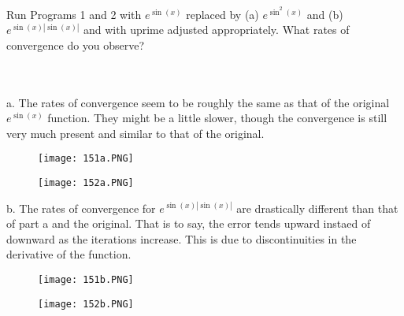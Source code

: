 Run Programs 1 and 2 with $e^{\sin(x)}$ replaced by (a) $e^{\sin^2(x)}$ and (b) $e^{\sin(x)|\sin(x)|}$
and with uprime adjusted appropriately. What rates of convergence do you observe?\\\\

\begin{solution}\renewcommand{\qedsymbol}{}\ \\
    a. The rates of convergence seem to be roughly the same as that of the original $e^{\sin(x)}$
    function. They might be a little slower, though the convergence is still very much present and
    similar to that of the original.\\

    \begin{figure}[htp]
        \centering
        \texttt{[image: 151a.PNG]}
    \end{figure}
    \begin{figure}[htp]
        \centering
        \texttt{[image: 152a.PNG]}
    \end{figure}



b. The rates of convergence for $e^{\sin(x)|\sin(x)|}$ are drastically different than that of part a and
the original. That is to say, the error tends upward instaed of downward as the iterations increase.
This is due to discontinuities in the derivative of the function.

    \begin{figure}[htp]
        \centering
        \texttt{[image: 151b.PNG]}
    \end{figure}
    \begin{figure}[htp]
        \centering
        \texttt{[image: 152b.PNG]}
    \end{figure}

\end{solution}

\newpage


\newpage
\newpage


\newpage
